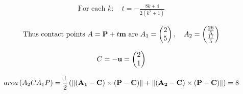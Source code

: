 \documentclass{beamer}
\numberwithin{equation}{section}
\begin{document}
\begin{align}
\text{For each }k:\quad t=-\frac{8k+4}{2(k^2+1)}
\end{align}

\begin{align}
\text{Thus contact points }A=\mathbf{P}+t\mathbf{m}\text{ are }
A_1=\begin{pmatrix}2\\5\end{pmatrix},\quad A_2=\begin{pmatrix}\frac{26}{5}\\\frac{17}{5}\end{pmatrix}
\end{align}

\begin{align}
C=-\mathbf{u}=\begin{pmatrix}2\\1\end{pmatrix}
\end{align}

\begin{align}
	area\left(A_2CA_1P\right)=\frac{1}{2}\left(\left\lVert\left(\mathbf{A_1}-\mathbf{C}\right)\times\left(\mathbf{P}-\mathbf{C}\right)\right\rVert+\left\lVert\left(\mathbf{A_2}-\mathbf{C}\right)\times\left(\mathbf{P}-\mathbf{C}\right)\right\rVert\right)=8
\end{align}
\end{document}

